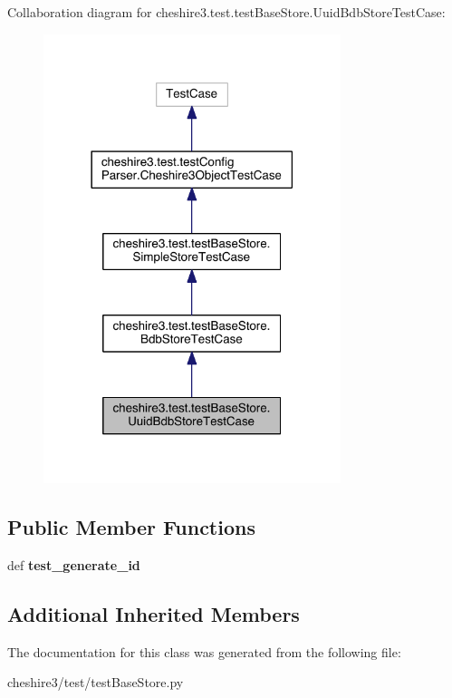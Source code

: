 Collaboration diagram for cheshire3.\-test.\-test\-Base\-Store.\-Uuid\-Bdb\-Store\-Test\-Case\-:
\nopagebreak
\begin{figure}[H]
\begin{center}
\leavevmode
\includegraphics[width=246pt]{classcheshire3_1_1test_1_1test_base_store_1_1_uuid_bdb_store_test_case__coll__graph}
\end{center}
\end{figure}
\subsection*{Public Member Functions}
\begin{DoxyCompactItemize}
\item 
\hypertarget{classcheshire3_1_1test_1_1test_base_store_1_1_uuid_bdb_store_test_case_a77baf9ceaf5ca5b2711125c1c1f1bc69}{def {\bfseries test\-\_\-generate\-\_\-id}}\label{classcheshire3_1_1test_1_1test_base_store_1_1_uuid_bdb_store_test_case_a77baf9ceaf5ca5b2711125c1c1f1bc69}

\end{DoxyCompactItemize}
\subsection*{Additional Inherited Members}


The documentation for this class was generated from the following file\-:\begin{DoxyCompactItemize}
\item 
cheshire3/test/test\-Base\-Store.\-py\end{DoxyCompactItemize}
